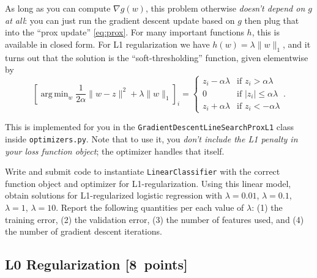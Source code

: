 \documentclass{article}
\newenvironment{asking}{\begingroup\color{blu}}{\endgroup}
\newcommand\pts[1]{\textcolor{pointscolour}{[#1~points]}}
\DeclareMathOperator*{\argmin}{arg\,min}
\newcommand{\norm}[1]{\lVert #1 \rVert}
\begin{document}
{    As long as you can compute $\nabla g(w)$, this problem otherwise \emph{doesn't depend on $g$ at all}:
    you can just run the gradient descent update based on $g$ then plug that into the ``prox update'' \eqref{eq:prox}.
    For many important functions $h$, this is available in closed form.
    For L1 regularization we have $h(w) = \lambda \norm{w}_1$,
    and it turns out that the solution is the ``soft-thresholding'' function,
    given elementwise by
    \[
        \left[ \argmin_w \frac{1}{2 \alpha} \norm{w - z}^2 + \lambda \norm{w}_1 \right]_i
        = \begin{cases}
            z_i - \alpha \lambda & \text{if } z_i > \alpha \lambda \\
            0                    & \text{if } \lvert z_i \rvert \le \alpha \lambda \\
            z_i + \alpha \lambda & \text{if } z_i < -\alpha \lambda
        \end{cases}
    .\]
}

This is implemented for you in the \verb|GradientDescentLineSearchProxL1| class inside \verb|optimizers.py|.
Note that to use it, you \emph{don't include the L1 penalty in your loss function object};
the optimizer handles that itself.

\begin{asking}Write and submit code to instantiate \verb|LinearClassifier| with the correct function object and optimizer for L1-regularization. Using this linear model, obtain solutions for L1-regularized logistic regression with $\lambda = 0.01$, $\lambda = 0.1$, $\lambda = 1$, $\lambda = 10$. Report the following quantities per each value of $\lambda$: (1) the training error, (2) the validation error, (3) the number of features used, and (4) the number of gradient descent iterations.\end{asking}


\subsection{L0 Regularization \pts{8}}
\end{document}
